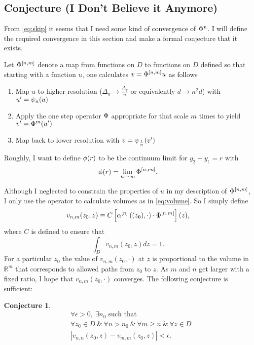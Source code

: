 \documentclass[twocolumn]{article}
\newcommand{\field}[1]{\mathbb{#1}}
\newcommand\REAL{\field{R}}
\newtheorem{conj}{Conjecture}
\begin{document}
\subsection{Conjecture (I Don't Believe it Anymore)}
\label{sec:conjecture}

From \eqref{eq:skip} it seems that I need some kind of convergence of
$\Phi^n$.  I will define the required convergence in this section and
make a formal conjecture that it exists.

Let $\Phi^{[n,m]}$ denote a map from functions on $D$ to
functions on $D$ defined so that starting with a function $u$, one
calculates $v = \Phi^{[n,m]}u$ as follows
\begin{enumerate}
\item Map $u$ to higher resolution ($\Delta_y \rightarrow
\frac{\Delta_y}{n}$ or equivalently $d \rightarrow n^2 d$) with
$u' = \psi_{n}(u)$
\item Apply the one step operator $\Phi$ appropriate for that scale
  $m$ times to yield $v' = \Phi^m(u')$
\item Map back to lower resolution with $v = \psi_{\frac{1}{n}}(v')$
\end{enumerate}

Roughly, I want to define $\phi(r)$ to be the continuum limit for
$y_2 - y_1 =r$ with
\begin{equation}
  \label{eq:phir}
  \phi(r) = \lim_{n \rightarrow \infty} \Phi^{[n,rn]}.
\end{equation}

Although I neglected to constrain the properties of $u$ in my
description of $\Phi^{[n,m]}$, I only use the operator to
calculate volumes as in \eqref{eq:volume}.  So I simply define
\begin{equation}
  \label{eq:def}
  v_{n,m}(z_0,z) \equiv C \left[
    \alpha^{[n]} \left( (z_0), \cdot \right)
    \cdot \Phi^{[n,m]}
  \right](z),
\end{equation}
where $C$ is defined to ensure that
\begin{equation*}
  \int_D v_{n,m}(z_0,z) dz = 1.
\end{equation*}
For a particular $z_0$ the value of $v_{n,m}(z_0,\cdot)$ at $z$ is
proportional to the volume in $\REAL^m$ that corresponds to allowed
paths from $z_0$ to $z$.  As $m$ and $n$ get larger with a fixed
ratio, I hope that $v_{n,m}(z_0,\cdot)$ converges.  The following
conjecture is sufficient:
\begin{conj}
  \label{conj}
  \begin{align*}
    & \forall \epsilon > 0,~ \exists n_0 \text{ such that } \\
    & \forall z_0 \in D ~\&~ \forall n > n_0 ~\&~ \forall m \geq n ~\&~
              \forall z \in D\\
    & \left| v_{n,n}(z_0,z) - v_{m,m}(z_0,z) \right| < \epsilon.
  \end{align*}
\end{conj}
\end{document}
